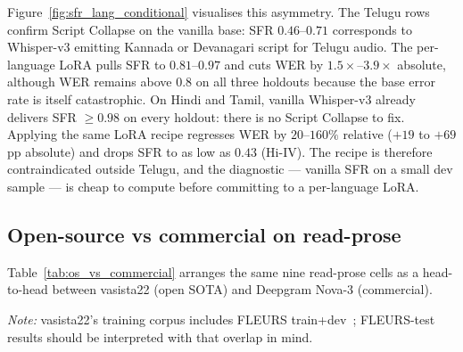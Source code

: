 \documentclass[conference,a4paper]{IEEEtran}
\begin{document}
Figure~\ref{fig:sfr_lang_conditional} visualises this asymmetry. The Telugu rows confirm Script Collapse on the vanilla base: SFR $0.46$--$0.71$ corresponds to Whisper-v3 emitting Kannada or Devanagari script for Telugu audio. The per-language LoRA pulls SFR to $0.81$--$0.97$ and cuts WER by $1.5\times$--$3.9\times$ absolute, although WER remains above $0.8$ on all three holdouts because the base error rate is itself catastrophic. On Hindi and Tamil, vanilla Whisper-v3 already delivers SFR $\geq 0.98$ on every holdout: there is no Script Collapse to fix. Applying the same LoRA recipe regresses WER by $20$--$160\%$ relative ($+19$ to $+69$ pp absolute) and drops SFR to as low as $0.43$ (Hi-IV). The recipe is therefore contraindicated outside Telugu, and the diagnostic --- vanilla SFR on a small dev sample --- is cheap to compute before committing to a per-language LoRA.

\subsection{Open-source vs commercial on read-prose}\label{sec:os_vs_commercial}

Table~\ref{tab:os_vs_commercial} arranges the same nine read-prose cells as a head-to-head between vasista22 (open SOTA) and Deepgram Nova-3 (commercial).

\begin{table}[t]
\centering
\caption{vasista22 (open SOTA) vs Deepgram Nova-3 (commercial) on read-prose holdouts. WER lower is better; SFR higher is better. Bold = winning WER per row.}
\label{tab:os_vs_commercial}

\vspace{2pt}
\footnotesize\noindent\textit{Note:} vasista22's training corpus includes FLEURS train+dev~\cite{vasista22}; FLEURS-test results should be interpreted with that overlap in mind.
\end{table}
\end{document}
